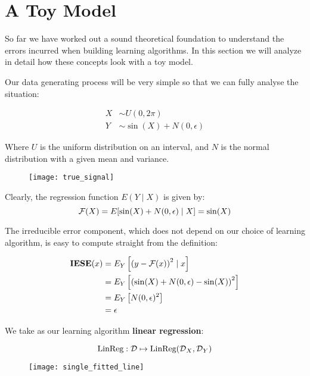 \section{A Toy Model}
%
%
\begin{frame}
  So far we have worked out a sound theoretical foundation to understand the
  errors incurred when building learning algorithms.  In this section we will
  analyze in detail how these concepts look with a toy model.
\end{frame}
%
%
\begin{frame}
  Our data generating process will be very simple so that we can fully analyse
  the situation:

  \begin{align*}
    X &\sim U(0, 2 \pi) \\
    Y &\sim \sin(X) + N(0, \epsilon)
  \end{align*}

  Where $U$ is the uniform distribution on an interval, and $N$ is the normal
  distribution with a given mean and variance.
\end{frame}
%
%
\begin{frame}
  \begin{figure}
    \texttt{[image: true\_signal]}
  \end{figure}

  Clearly, the regression function $E(Y \mid X)$ is given by:
  $$ \operatorname*{\mathcal{F}}(X) = E[ \sin(X) + N(0, \epsilon) \mid X ] = \sin(X) $$
\end{frame}
%
%
\begin{frame}
  The irreducible error component, which does not depend on our choice of
  learning algorithm, is easy to compute straight from the definition:

  \begin{align*}
      \operatorname*{\mathbf{IESE}}(x) &= E_Y \left[ \left( y - \operatorname*{\mathcal{F}}(x) \right)^2 \mid x \right] \\
      &= E_Y \left[ \left( \sin(X) + N(0, \epsilon) - \sin(X) \right)^2 \right] \\
      &= E_Y \left[ N(0, \epsilon)^2 \right] \\
      &= \epsilon
  \end{align*}
   
\end{frame}
%
%
\begin{frame}
  We take as our learning algorithm \textbf{linear regression}:

  $$ \operatorname*{\text{LinReg}}: \operatorname*{\mathcal{D}} \mapsto \operatorname*{\text{LinReg}}({\operatorname*{\mathcal{D}}}_{X}, {\operatorname*{\mathcal{D}}}_{Y}) $$

  \begin{figure}
    \texttt{[image: single\_fitted\_line]}
  \end{figure}
\end{frame}
